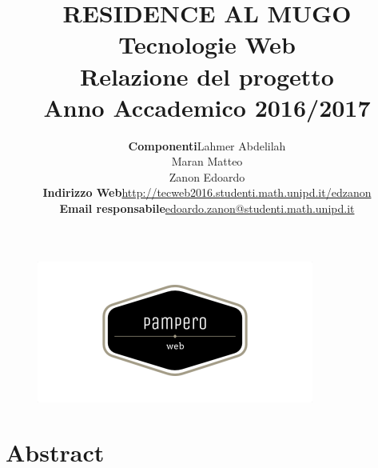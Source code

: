 \documentclass[12pt]{article}
\begin{document}
\begin{figure}
\centering
\includegraphics[scale=1.5]{images/Logo.png}
\end{figure} 

\title{ \textbf{{\Huge RESIDENCE AL MUGO}}\vspace{2cm} \\ {\Huge Tecnologie Web \\ Relazione del progetto} \\ {\vspace{1cm} \Large Anno Accademico 2016/2017} }
 
\author{
\begin{tabular}{r|l}
\textbf{Componenti} & Lahmer Abdelilah\\
&Maran Matteo\\
&Zanon Edoardo \vspace{0.3cm} \\
\textbf{Indirizzo Web} & \url{http://tecweb2016.studenti.math.unipd.it/edzanon}\vspace{0.3cm} \\
\textbf{Email responsabile} & \href{mailto:edoardo.zanon@studenti.math.unipd.it}{edoardo.zanon@studenti.math.unipd.it}
\end{tabular}
\vspace{2cm} 
}

\maketitle
\thispagestyle{empty}


\newpage


\pagestyle{fancy}
\lhead{}
\cfoot{}
\renewcommand{\footrulewidth}{0.5pt}

\tableofcontents

\newpage

\section{Abstract}
\end{document}
